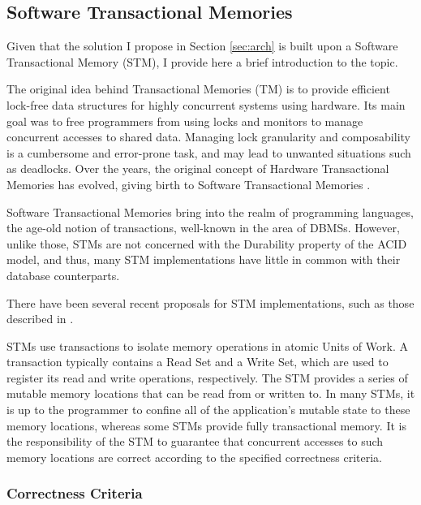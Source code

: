 \documentclass{llncs}
\begin{document}
\subsection{Software Transactional Memories}
\label{sec:stm}

Given that the solution I propose in Section \ref{sec:arch} is built
upon a Software Transactional Memory (STM), I provide here a brief
introduction to the topic.

The original idea behind Transactional Memories (TM)
\cite{herlihy1993transactional} is to provide efficient lock-free data
structures for highly concurrent systems using hardware. Its main goal
was to free programmers from using locks and monitors to manage
concurrent accesses to shared data. Managing lock granularity and
composability is a cumbersome and error-prone task, and may lead to
unwanted situations such as deadlocks. Over the years, the original
concept of Hardware Transactional Memories has evolved, giving birth
to Software Transactional Memories \cite{shavit1997software}.

Software Transactional Memories bring into the realm of programming
languages, the age-old notion of transactions, well-known in the area
of DBMSs. However, unlike those, STMs are not concerned with the
Durability property of the ACID model, and thus, many STM
implementations have little in common with their database
counterparts.

There have been several recent proposals for STM implementations, such
as those described in \cite{cachopo2006versioned, herlihy2003software,
  marathe2005adaptive, dice2006transactional, riegel2006lazy,
  marathe2006lowering}.

STMs use transactions to isolate memory operations in atomic Units of
Work. A transaction typically contains a Read Set and a Write Set,
which are used to register its read and write operations,
respectively. The STM provides a series of mutable memory locations
that can be read from or written to. In many STMs, it is up to the
programmer to confine all of the application's mutable state to these
memory locations, whereas some STMs provide fully transactional
memory. It is the responsibility of the STM to guarantee that
concurrent accesses to such memory locations are correct according to
the specified correctness criteria.

\subsubsection{Correctness Criteria}
\label{sec:opacity}
\end{document}
